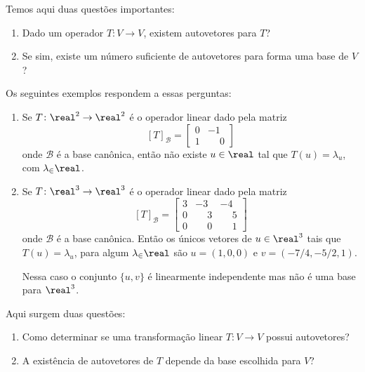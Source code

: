 Temos aqui duas questões importantes:
\begin{enumerate}
    \item Dado um operador $T \colon V \to V$, existem autovetores para $T$?

    \item Se sim, existe um número suficiente de autovetores para forma uma base de $V$?
\end{enumerate}

Os seguintes exemplos respondem a essas perguntas:

\begin{exemplos}
    \begin{enumerate}
        \item Se $T \colon \real^2 \to \real^2$ é o operador linear dado pela matriz
        \[
            [T]_\mathcal{B} = \begin{bmatrix}0 & -1\\1 & \phantom{-}0\end{bmatrix}
        \]
        onde $\mathcal{B}$ é a base canônica, então não existe $u \in \real$ tal que $T(u) = \lambda_u$, com $\lambda_\in \real$.

        \item Se $T \colon \real^3 \to \real^3$ é o operador linear dado pela matriz
        \[
        [T]_\mathcal{B} = \begin{bmatrix}3 & -3 & -4\\0 & \phantom{-}3 & \phantom{-}5\\0 & \phantom{-}0 & \phantom{-}1\end{bmatrix}
        \]
        onde $\mathcal{B}$ é a base canônica. Então os únicos vetores de $u \in \real^3$ tais que $T(u) = \lambda_u$, para algum $\lambda_\in \real$ são $u = (1, 0, 0)$ e $v = (-7/4, -5/2, 1)$.

        Nessa caso o conjunto $\{u, v\}$ é linearmente independente mas não é uma base para $\real^3$.
    \end{enumerate}
\end{exemplos}

Aqui surgem duas questões:
\begin{enumerate}
    \item Como determinar se uma transformação linear $T \colon V \to V$ possui autovetores?

    \item A existência de autovetores de $T$ depende da base escolhida para $V$?
\end{enumerate}

